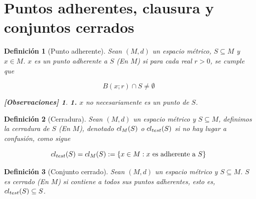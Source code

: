 \documentclass[oneside]{book} %
\theoremstyle{Teorema}
\newtheorem{Definicion}{Definición}[chapter]
\theoremstyle{Ejemplos}
\theoremstyle{[Obs]}
\newtheorem*{Obs}{[Observaciones]}
\def \test {test}
\newcommand{\cerradura}[2][\test]{\ifx \test #1 {\overline{#2}} \else {cl_{#1}(#2)} \fi} %
\renewcommand{\{}{\left\lbrace} %
\renewcommand{\}}{\right\rbrace} %
\newcommand{\n}{\cap} %
\renewcommand{\sc}{\subseteq} %
\begin{document}
		\section{Puntos adherentes, clausura y conjuntos cerrados}

			\begin{Definicion}[Punto adherente]\setlength{\parindent}{0em}
				
				Sean $(M, d)$ un espacio métrico, $S \sc M$ y $x \in M$. $x$ es un punto adherente a $S$ (En $M$) si para cada real $r > 0$, se cumple que 
				
				\[ B(x;r) \n S \neq \emptyset \]

				\begin{Obs}
				
					\textbf{1.} $x$ no necesariamente es un punto de $S$.
				
				\end{Obs}

			\end{Definicion}

			\begin{Definicion}[Cerradura]\setlength{\parindent}{0em}
				
				Sean $(M, d)$ un espacio métrico y $S \sc M$, definimos la cerradura de $S$ (En $M$), denotado $\cerradura[M]{S}$ o $\cerradura{S}$ si no hay lugar a confusión, como sigue

				\[ \cerradura{S} = \cerradura[M]{S} := \{ x \in M : x \text{ es adherente a } S \} \] 

			\end{Definicion}

			\begin{Definicion}[Conjunto cerrado]\setlength{\parindent}{0em}

				Sean $(M, d)$ un espacio métrico y $S \sc M$. $S$ es cerrado (En $M$) si contiene a todos sus puntos adherentes, esto es, $\cerradura{S} \sc S$. \\

			\end{Definicion}
\end{document}
